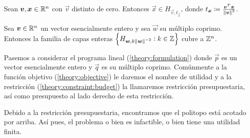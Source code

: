 % 
% 
% 
% 
% 
% 

\begin{lemma}
	\label{phase-1:lemma:layer}
	Sean $\boldsymbol{v}, \boldsymbol{x} \in \mathbb{R}^n$ con $\vec{v}$ distinto de cero. Entonces $\vec{x} \in
	H_{\vec{v}, t_{\vec{x}}}$, donde $t_{\boldsymbol{x}} \coloneq \frac{\boldsymbol{v}^T\boldsymbol{x}}{\left\lVert \boldsymbol{v} \right\rVert^2}$.
\end{lemma}

\begin{theorem}
	\label{phase-1:th:cover}
	Sea $\boldsymbol{v} \in \mathbb{R}^n$ un vector esencialmente entero y sea $\vec{w}$ su múltiplo coprimo.
	Entonces la familia de capas enteras $\left\lbrace H_{\boldsymbol{w}, k\left\lVert \boldsymbol{w} \right\rVert^{-2}} \vcentcolon k
			\in \mathbb{Z} \right\rbrace$ cubre a $\mathbb{Z}^n$.
\end{theorem}

Pasemos a considerar el programa lineal (\ref{theory:formulation}) donde $\vec{p}$ es un vector
esencialmente entero y $\vec{q}$ es su múltiplo coprimo. Comúnmente a la función objetivo
(\ref{theory:objective}) le daremos el nombre de utilidad y a la restricción
(\ref{theory:constraint:budget}) la llamaremos restricción presupuestaria, así como presupuesto al
lado derecho de esta restricción.
\begin{observation}
	Debido a la restricción presupuestaria, encontramos que el politopo está acotado por arriba. Así
	pues, el problema o bien es infactible, o bien tiene una utilidad finita.
\end{observation}

